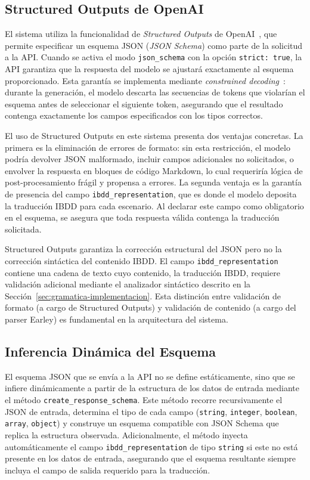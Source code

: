 \subsection{Structured Outputs de OpenAI}
\label{sec:structured-outputs}

El sistema utiliza la funcionalidad de \textit{Structured Outputs} de OpenAI~\cite{openai2024structured}, que permite especificar un esquema JSON (\textit{JSON Schema}) como parte de la solicitud a la API. Cuando se activa el modo \texttt{json\_schema} con la opción \texttt{strict:~true}, la API garantiza que la respuesta del modelo se ajustará exactamente al esquema proporcionado. Esta garantía se implementa mediante \textit{constrained decoding}~\cite{openai2024structured}: durante la generación, el modelo descarta las secuencias de tokens que violarían el esquema antes de seleccionar el siguiente token, asegurando que el resultado contenga exactamente los campos especificados con los tipos correctos.

El uso de Structured Outputs en este sistema presenta dos ventajas concretas. La primera es la eliminación de errores de formato: sin esta restricción, el modelo podría devolver JSON malformado, incluir campos adicionales no solicitados, o envolver la respuesta en bloques de código Markdown, lo cual requeriría lógica de post-procesamiento frágil y propensa a errores. La segunda ventaja es la garantía de presencia del campo \texttt{ibdd\_representation}, que es donde el modelo deposita la traducción IBDD para cada escenario. Al declarar este campo como obligatorio en el esquema, se asegura que toda respuesta válida contenga la traducción solicitada.

Structured Outputs garantiza la corrección estructural del JSON pero no la corrección sintáctica del contenido IBDD. El campo \texttt{ibdd\_representation} contiene una cadena de texto cuyo contenido, la traducción IBDD, requiere validación adicional mediante el analizador sintáctico descrito en la Sección~\ref{sec:gramatica-implementacion}. Esta distinción entre validación de formato (a cargo de Structured Outputs) y validación de contenido (a cargo del parser Earley) es fundamental en la arquitectura del sistema.

\subsection{Inferencia Dinámica del Esquema}

El esquema JSON que se envía a la API no se define estáticamente, sino que se infiere dinámicamente a partir de la estructura de los datos de entrada mediante el método \texttt{create\_response\_schema}. Este método recorre recursivamente el JSON de entrada, determina el tipo de cada campo (\texttt{string}, \texttt{integer}, \texttt{boolean}, \texttt{array}, \texttt{object}) y construye un esquema compatible con JSON Schema que replica la estructura observada. Adicionalmente, el método inyecta automáticamente el campo \texttt{ibdd\_representation} de tipo \texttt{string} si este no está presente en los datos de entrada, asegurando que el esquema resultante siempre incluya el campo de salida requerido para la traducción.

